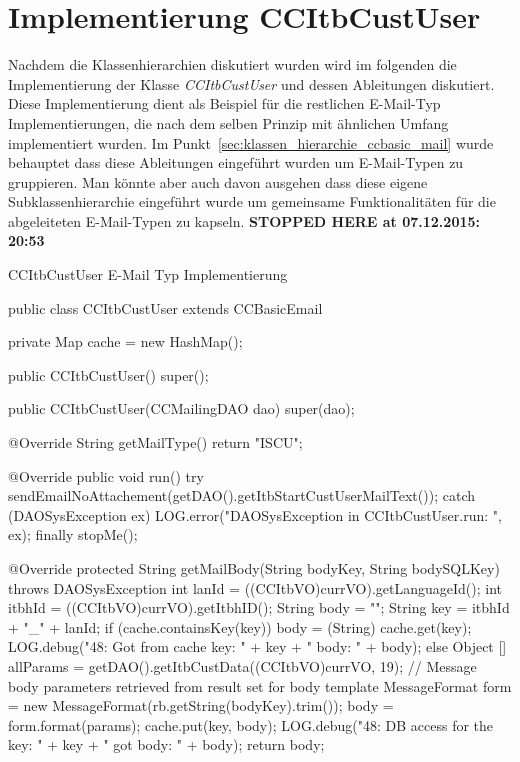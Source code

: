 \section{Implementierung CCItbCustUser}
Nachdem die Klassenhierarchien diskutiert wurden wird im folgenden die Implementierung der Klasse \emph{CCItbCustUser} und dessen Ableitungen diskutiert. Diese Implementierung dient als Beispiel für die restlichen E-Mail-Typ Implementierungen, die nach dem selben Prinzip mit ähnlichen Umfang implementiert wurden. Im Punkt~\ref{sec:klassen_hierarchie_ccbasic_mail} wurde behauptet dass diese Ableitungen eingeführt wurden um E-Mail-Typen zu gruppieren. Man könnte aber auch davon ausgehen dass diese eigene Subklassenhierarchie eingeführt wurde um gemeinsame Funktionalitäten für die abgeleiteten E-Mail-Typen zu kapseln. 
\newline\textbf{STOPPED HERE at 07.12.2015: 20:53}
\begin{program}
\caption{CCItbCustUser E-Mail Typ Implementierung}
\label{CCItbCustUser.java}
\begin{JavaCode}
public class CCItbCustUser extends CCBasicEmail {
	
	private Map cache = new HashMap();

	public CCItbCustUser() {
		super();
	}

	public CCItbCustUser(CCMailingDAO dao) {
		super(dao);
	}

	@Override
	String getMailType() {
		return "ISCU";
	}
	
	@Override
	public void run() {
		try {
			sendEmailNoAttachement(getDAO().getItbStartCustUserMailText());
		} catch (DAOSysException ex) {
			LOG.error("DAOSysException in CCItbCustUser.run: ",
						ex);
		} finally {
			stopMe();
		}
	}
	
	@Override
	protected String getMailBody(String bodyKey, String bodySQLKey)
		throws DAOSysException {
		int lanId = ((CCItbVO)currVO).getLanguageId();
		int itbhId = ((CCItbVO)currVO).getItbhID();
		String body = "";
		String key = itbhId	+ "_" + lanId;
		if (cache.containsKey(key)) {
			body = (String) cache.get(key);
			LOG.debug("48: Got from cache key: " + key 
								+ " body: " + body);
		} else {
			Object [] allParams = getDAO().getItbCustData((CCItbVO)currVO, 19);
			// Message body parameters retrieved from result set for body template
			MessageFormat form = new MessageFormat(rb.getString(bodyKey).trim());
	 		body = form.format(params);
	 		cache.put(key, body);
	 		LOG.debug("48: DB access for the key: " + key
	 						+ " got body: " + body);
		}
		return body;
	}
}
\end{JavaCode}
\end{program}

